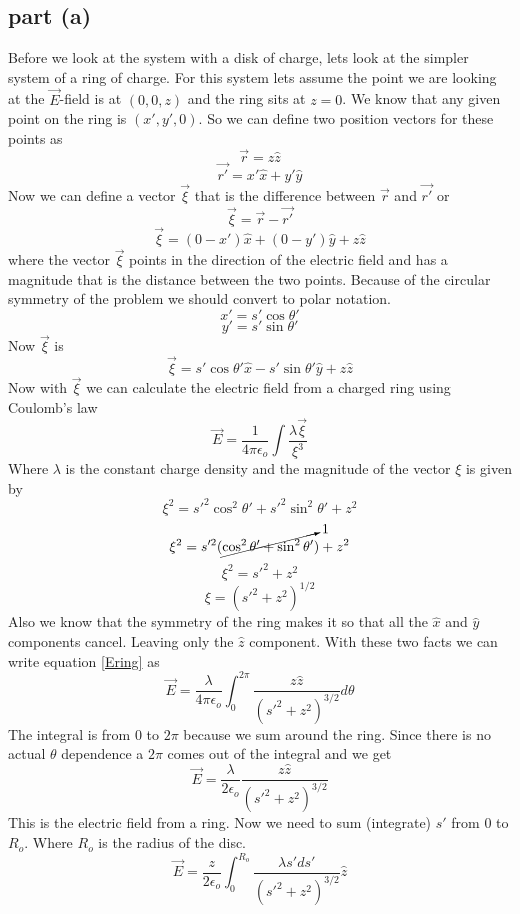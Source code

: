 \documentclass[11pt]{article}
\numberwithin{equation}{section}
\begin{document}
\subsection{part (a)}
Before we look at the system with a disk of charge, lets look at the simpler system of a ring of charge.
For this system lets assume the point we are looking at the $\vec{E}$-field is at $(0,0,z)$ and the ring sits at $z = 0$. We know that any given point on the ring is $(x', y', 0)$. So we can define two position vectors for these points as
$$\vec{r} = z\hat{z}$$ 
$$\vec{r'} = x'\hat{x}+y'\hat{y}$$
Now we can define a vector $\vec{\xi}$ that is the difference between $\vec{r}$ and $\vec{r'}$ or
\begin{equation}
\vec{\xi} = \vec{r} - \vec{r'}
\label{srptR}
\end{equation}
$$\vec{\xi} = (0 - x')\hat{x} + (0 - y')\hat{y} + z\hat{z}$$
where the vector $\vec{\xi}$ points in the direction of the electric field and has a magnitude that is the distance between the two points. Because of the circular symmetry of the problem we should convert to polar notation.
$$x' = s'\cos{\theta'}$$
$$y' = s'\sin{\theta'}$$
Now $\vec{\xi}$ is
$$\vec{\xi} = s'\cos{\theta'} \hat{x} - s'\sin{\theta'} \hat{y} + z\hat{z}$$
Now with $\vec{\xi}$ we can calculate the electric field from a charged ring using Coulomb's law
\begin{equation}
\vec{E} = \frac{1}{4\pi\epsilon_o}\int \frac{\lambda\vec{\xi}}{\xi^3}
\label{Ering}
\end{equation}
Where $\lambda$ is the constant charge density and the magnitude of the vector $\xi$ is given by
$$\xi^2 = s'^2\cos^2{\theta'} + s'^2\sin^2{\theta'} + z^2$$
$$\xi^2 = s'^2(\cancelto{1}{\cos^2{\theta'} + \sin^2{\theta'}}) + z^2$$
$$\xi^2 = s'^2 + z^2$$
$$\xi = (s'^2 + z^2)^{1/2}$$
Also we know that the symmetry of the ring makes it so that all the $\hat{x}$ and $\hat{y}$ components cancel. Leaving only the $\hat{z}$ component. With these two facts we can write equation \ref{Ering} as
$$\vec{E} = \frac{\lambda}{4\pi\epsilon_o}\int_0^{2\pi} \frac{z\hat{z}}{(s'^2 + z^2)^{3/2}} d\theta$$
The integral is from $0$ to $2\pi$ because we sum around the ring. Since there is no actual $\theta$ dependence a $2\pi$ comes out of the integral and we get
$$\vec{E} = \frac{\lambda}{2\epsilon_o} \frac{z\hat{z}}{(s'^2 + z^2)^{3/2}}$$
This is the electric field from a ring. Now we need to sum (integrate) $s'$ from $0$ to $R_o$. Where $R_o$ is the radius of the disc. 
\begin{equation}
\vec{E} = \frac{z}{2\epsilon_o}\int_0^{R_o} \frac{\lambda s'ds'}{(s'^2 + z^2)^{3/2}} \hat{z}
\label{Edisc}
\end{equation}
\end{document}
